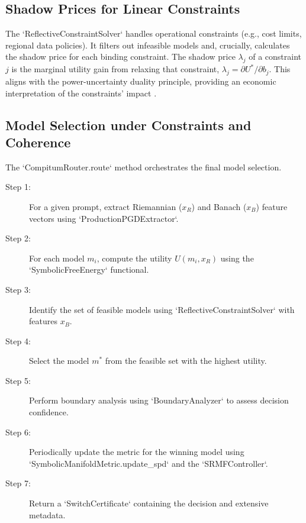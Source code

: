 \documentclass[11pt]{article}
\begin{document}
\subsection{Shadow Prices for Linear Constraints}
\label{proposition:bk2_constraints_lp_shadow_prices}
The `ReflectiveConstraintSolver` handles operational constraints (e.g., cost limits, regional data policies). It filters out infeasible models and, crucially, calculates the shadow price for each binding constraint. The shadow price $\lambda_j$ of a constraint $j$ is the marginal utility gain from relaxing that constraint, $\lambda_j = \partial U^* / \partial b_j$. This aligns with the power-uncertainty duality principle, providing an economic interpretation of the constraints' impact \cite{principia_symbolica}.

\subsection{Model Selection under Constraints and Coherence}
\label{alg:bk2_router_selection_entropy_gap}
The `CompitumRouter.route` method orchestrates the final model selection.
\begin{description}
    \item[Step 1:] For a given prompt, extract Riemannian ($x_R$) and Banach ($x_B$) feature vectors using `ProductionPGDExtractor`.
    \item[Step 2:] For each model $m_i$, compute the utility $U(m_i, x_R)$ using the `SymbolicFreeEnergy` functional.
    \item[Step 3:] Identify the set of feasible models using `ReflectiveConstraintSolver` with features $x_B$.
    \item[Step 4:] Select the model $m^*$ from the feasible set with the highest utility.
    \item[Step 5:] Perform boundary analysis using `BoundaryAnalyzer` to assess decision confidence.
    \item[Step 6:] Periodically update the metric for the winning model using `SymbolicManifoldMetric.update_spd` and the `SRMFController`.
    \item[Step 7:] Return a `SwitchCertificate` containing the decision and extensive metadata.
\end{description}
\end{document}
